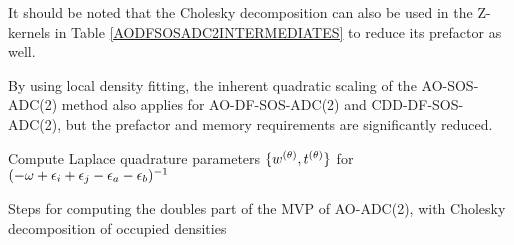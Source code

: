It should be noted that the Cholesky decomposition can also be used in the Z-kernels in Table \ref{AODFSOSADC2INTERMEDIATES} to reduce its prefactor as well. 

By using local density fitting, the inherent quadratic scaling of the AO-SOS-ADC(2) method also applies for AO-DF-SOS-ADC(2) and CDD-DF-SOS-ADC(2), but the prefactor and memory requirements are significantly reduced.


\begin{algorithm}
Compute Laplace quadrature parameters $\{w^{(\theta)},t^{(\theta)}\}$ for $(-\omega + \epsilon_i + \epsilon_j - \epsilon_a - \epsilon_b)^{-1}$
\\
\caption{Steps for computing the doubles part of the MVP of AO-ADC(2), with Cholesky decomposition of occupied densities}
\label{AODFSOSADC2EOB}
\end{algorithm}
